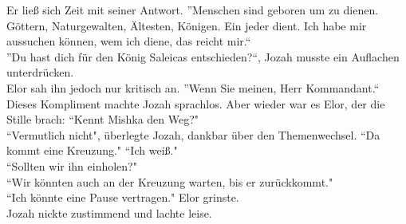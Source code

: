 Er ließ sich Zeit mit seiner Antwort. ''Menschen sind geboren um zu dienen. Göttern, Naturgewalten, 
Ältesten, Königen. Ein jeder dient. Ich habe mir aussuchen können, wem ich diene, das reicht 
mir.``\\
''Du hast dich für den König Saleicas entschieden?``, Jozah musste ein Auflachen unterdrücken.\\
Elor sah ihn jedoch nur kritisch an. ''Wenn Sie meinen, Herr Kommandant.``\\
Dieses Kompliment machte Jozah sprachlos. Aber wieder war es Elor, der die Stille brach: ``Kennt 
Mishka den Weg?"\\
``Vermutlich nicht", überlegte Jozah, dankbar über den Themenwechsel.
``Da kommt eine Kreuzung."
``Ich weiß."\\
``Sollten wir ihn einholen?"\\
``Wir könnten auch an der Kreuzung warten, bis er zurückkommt."\\
``Ich könnte eine Pause vertragen." Elor grinste.\\
Jozah nickte zustimmend und lachte leise. \\


